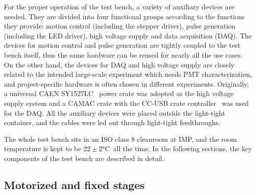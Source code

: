 \documentclass{nst}
\begin{document}
For the proper operation of the test bench, a variety of auxiliary devices are needed. 
They are divided into four functional groups according to the functions they provide: motion control (including the stepper driver), pulse generation (including the LED driver), high voltage supply and data acquisition (DAQ).
The devices for motion control and pulse generation are tightly coupled to the test bench itself, thus the same hardware can be reused for nearly all the use cases.
On the other hand, the devices for DAQ and high voltage supply are closely related to the intended large-scale experiment which needs PMT characterization, and project-specific hardware is often chosen in different experiments.
Originally, a universal CAEN SY1527LC~\cite{sy1527lc} power crate was adopted as the high voltage supply system and a CAMAC crate with the CC-USB crate controller~\cite{cc_usb} was used for the DAQ.
All the auxiliary devices were placed outside the light-tight container, and the cables were led out through light-tight feedthroughs.

The whole test bench sits in an ISO class 8 cleanroom at IMP, and the room temperature is kept to be $22\pm2$\si{\celsius}~all the time. 
In the following sections, the key components of the test bench are described in detail.

\subsection{Motorized and fixed stages}
\label{sec:stages}
\end{document}
